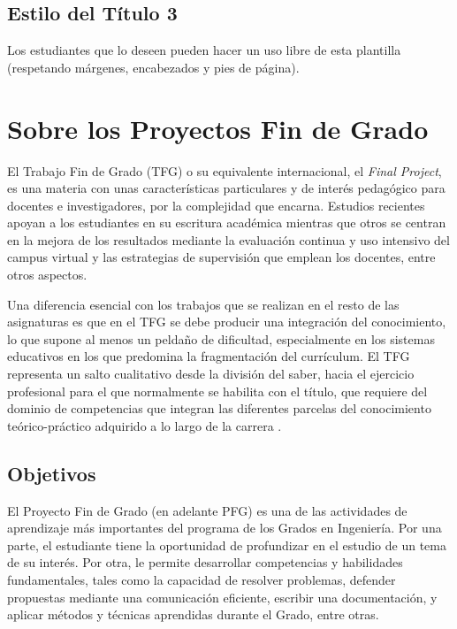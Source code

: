 \subsection{Estilo del Título 3}

Los estudiantes que lo deseen pueden hacer un uso libre de esta plantilla (respetando márgenes, encabezados y pies de página).

\section{Sobre los Proyectos Fin de Grado}

El Trabajo Fin de Grado (TFG) o su equivalente internacional, el \textit{Final Project}, es una materia con unas características particulares y de interés pedagógico para docentes e investigadores, por la complejidad que encarna. Estudios recientes apoyan a los estudiantes en su escritura académica mientras que otros se centran en la mejora de los resultados mediante la evaluación continua y uso intensivo del campus virtual y las estrategias de supervisión que emplean los docentes, entre otros aspectos.

Una diferencia esencial con los trabajos que se realizan en el resto de las asignaturas es que en el TFG se debe producir una integración del conocimiento, lo que supone al menos un peldaño de dificultad, especialmente en los sistemas educativos en los que predomina la fragmentación del currículum. El TFG representa un salto cualitativo desde la división del saber, hacia el ejercicio profesional para el que normalmente se habilita con el título, que requiere del dominio de competencias que integran las diferentes parcelas del conocimiento teórico-práctico adquirido a lo largo de la carrera \cite{camilli}.

\subsection{Objetivos}


El Proyecto Fin de Grado (en adelante PFG) es una de las actividades de aprendizaje más importantes del programa de los Grados en Ingeniería. Por una parte, el estudiante tiene la oportunidad de profundizar en el estudio de un tema de su interés. Por otra, le permite desarrollar competencias y habilidades fundamentales, tales como la capacidad de resolver problemas, defender propuestas mediante una comunicación eficiente, escribir una documentación, y aplicar métodos y técnicas aprendidas durante el Grado, entre otras.

